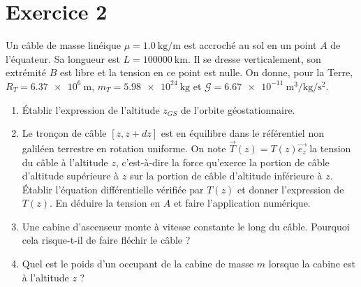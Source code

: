 \documentclass[a4paper,12pt,french]{article}
\begin{document}
\section{Exercice 2}

Un câble de masse linéique $\mu = \SI{1.0}{\kilogram\per\meter}$ est accroché au sol en un point $A$ de l'équateur. Sa longueur est $L = \SI{100000}{\kilo\meter}$. Il se dresse verticalement, son extrémité $B$ est libre et la tension en ce point est nulle. On donne, pour la Terre, $R_T = \SI{6.37e6}{\meter}$, $m_T = \SI{5.98e24}{\kilogram}$ et $\mathcal{G} = \SI{6.67e-11}{\meter\cubed\per\kilogram\per\second\squared}$.

\begin{enumerate}
	\item Établir l'expression de l'altitude $z_{GS}$ de l'orbite géostationnaire.
	\item Le tronçon de câble $[z, z+dz]$ est en équilibre dans le référentiel non galiléen terrestre en rotation uniforme. On note $\vec{T}(z) = T(z)\vec{e_z}$ la tension du câble à l'altitude $z$, c'est-à-dire la force qu'exerce la portion de câble d'altitude supérieure à $z$ sur la portion de câble d'altitude inférieure à $z$. Établir l'équation différentielle vérifiée par $T(z)$ et donner l'expression de $T(z)$. En déduire la tension en $A$ et faire l'application numérique.
	\item Une cabine d'ascenseur monte à vitesse constante le long du câble. Pourquoi cela risque-t-il de faire fléchir le câble ?
	\item Quel est le poids d'un occupant de la cabine de masse $m$ lorsque la cabine est à l'altitude $z$ ?
\end{enumerate}

\newpage
\end{document}
